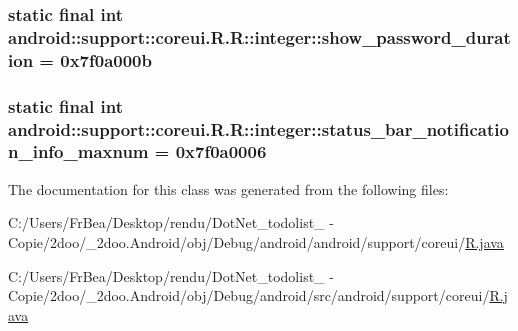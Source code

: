 \hypertarget{classandroid_1_1support_1_1coreui_1_1_r_1_1integer_3fe1e0436615ea76758dde9e4824639f}{
\subsubsection[{show\_\-password\_\-duration}]{\setlength{\rightskip}{0pt plus 5cm}static final int android::support::coreui.R.R::integer::show\_\-password\_\-duration = 0x7f0a000b}}
\label{classandroid_1_1support_1_1coreui_1_1_r_1_1integer_3fe1e0436615ea76758dde9e4824639f}


\hypertarget{classandroid_1_1support_1_1coreui_1_1_r_1_1integer_db95487e777a00c11ed4d72d010487a7}{
\subsubsection[{status\_\-bar\_\-notification\_\-info\_\-maxnum}]{\setlength{\rightskip}{0pt plus 5cm}static final int android::support::coreui.R.R::integer::status\_\-bar\_\-notification\_\-info\_\-maxnum = 0x7f0a0006}}
\label{classandroid_1_1support_1_1coreui_1_1_r_1_1integer_db95487e777a00c11ed4d72d010487a7}




The documentation for this class was generated from the following files:\begin{CompactItemize}
\item 
C:/Users/FrBea/Desktop/rendu/DotNet\_\-todolist\_ - Copie/2doo/\_\-2doo.Android/obj/Debug/android/android/support/coreui/\hyperlink{android_2support_2coreui_2_r_8java}{R.java}\item 
C:/Users/FrBea/Desktop/rendu/DotNet\_\-todolist\_ - Copie/2doo/\_\-2doo.Android/obj/Debug/android/src/android/support/coreui/\hyperlink{src_2android_2support_2coreui_2_r_8java}{R.java}\end{CompactItemize}
